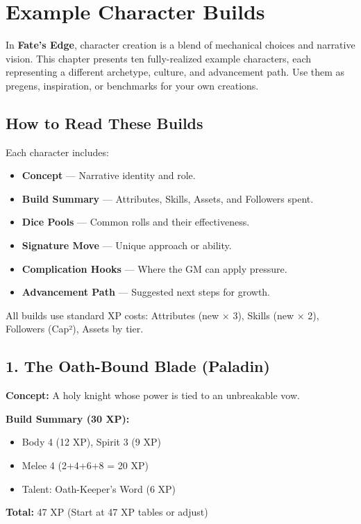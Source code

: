 
\chapter{Example Character Builds}
\label{ch:example-builds}

In \textbf{Fate's Edge}, character creation is a blend of mechanical choices and narrative vision. This chapter presents ten fully-realized example characters, each representing a different archetype, culture, and advancement path. Use them as pregens, inspiration, or benchmarks for your own creations.

\section{How to Read These Builds}

Each character includes:
\begin{itemize}
  \item \textbf{Concept} — Narrative identity and role.
  \item \textbf{Build Summary} — Attributes, Skills, Assets, and Followers spent.
  \item \textbf{Dice Pools} — Common rolls and their effectiveness.
  \item \textbf{Signature Move} — Unique approach or ability.
  \item \textbf{Complication Hooks} — Where the GM can apply pressure.
  \item \textbf{Advancement Path} — Suggested next steps for growth.
\end{itemize}

All builds use standard XP costs: Attributes (new × 3), Skills (new × 2), Followers (Cap²), Assets by tier.

\section{1. The Oath-Bound Blade (Paladin)}

\textbf{Concept:} A holy knight whose power is tied to an unbreakable vow.

\textbf{Build Summary (30 XP):}
\begin{itemize}
  \item Body 4 (12 XP), Spirit 3 (9 XP)
  \item Melee 4 (2+4+6+8 = 20 XP)
  \item Talent: Oath-Keeper's Word (6 XP)
\end{itemize}
\textbf{Total:} 47 XP (Start at 47 XP tables or adjust)

